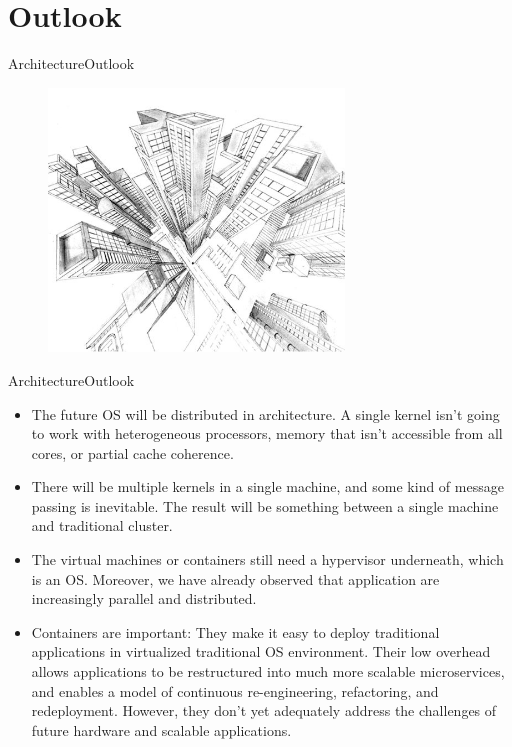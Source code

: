 \documentclass[10pt]{beamer}
\begin{document}
\section{Outlook}
\begin{frame}{Architecture}{Outlook}
  \begin{figure}[ht]
    \centering
    \includegraphics[width=0.7\textwidth, keepaspectratio=true]{images/outlook.jpg}
  \end{figure}
\end{frame}

\begin{frame}{Architecture}{Outlook}
  \begin{itemize}
    \item The future OS will be distributed in architecture. A single kernel
          isn't going to work with heterogeneous processors, memory that isn't
          accessible from all cores, or partial cache coherence. \pause
    \item There will be multiple kernels in a single machine, and some kind of
          message passing is inevitable. The result will be something between a
          single machine and traditional cluster. \pause
    \item The virtual machines or containers still need a hypervisor
          underneath, which is an OS\@. Moreover, we have already observed that
          application are increasingly parallel and distributed. \pause
    \item Containers are important: They make it easy to deploy traditional
          applications in virtualized traditional OS environment. Their low
          overhead allows applications to be restructured into much more
          scalable microservices, and enables a model of continuous
          re-engineering, refactoring, and redeployment. However, they don't
          yet adequately address the challenges of future hardware and scalable
          applications.
  \end{itemize}
\end{frame}
\end{document}
